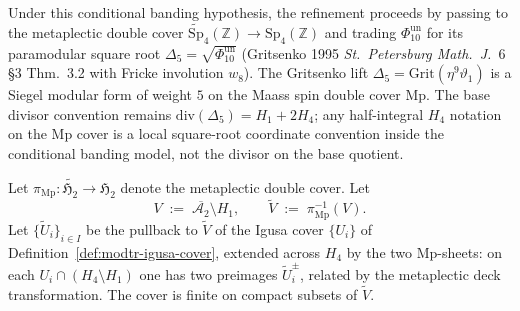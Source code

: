 Under this conditional banding hypothesis, the refinement proceeds by passing to the metaplectic double cover
$\widetilde{\mathrm{Sp}}_4(\mathbb Z)\to\mathrm{Sp}_4(\mathbb Z)$ and
trading $\Phi_{10}^{\mathrm{un}}$ for its paramodular square root
$\Delta_5 = \sqrt{\Phi_{10}^{\mathrm{un}}}$ (Gritsenko 1995 \emph{St.~Petersburg
Math.~J.}~6 \S3 Thm.~3.2 with Fricke involution $w_8$). The Gritsenko
lift $\Delta_5 = \mathrm{Grit}(\eta^9\vartheta_1)$ is a Siegel modular
form of weight $5$ on the Maass spin double cover $\mathrm{Mp}$. The
base divisor convention remains
$\mathrm{div}(\Delta_5)=H_1+2H_4$; any half-integral $H_4$ notation on
the Mp cover is a local square-root coordinate convention inside the
conditional banding model, not the divisor on the base quotient.

\begin{definition}[Metaplectic Igusa cover of \texorpdfstring{$V = \overline{\mathcal A_2}\setminus H_1$}{V = overlineA-2setminus H-1}]
\label{def:modtr-mu16-metaplectic-cover}
Let $\pi_{\mathrm{Mp}}\colon\widetilde{\mathfrak H_2}\to\mathfrak H_2$
denote the metaplectic double cover. Let
\[
 V \;:=\; \overline{\mathcal A_2}\setminus H_1,
 \qquad
 \widetilde V \;:=\; \pi_{\mathrm{Mp}}^{-1}(V).
\]
Let $\{\widetilde U_i\}_{i\in I}$ be the pullback to $\widetilde V$ of
the Igusa cover $\{U_i\}$ of
Definition~\ref{def:modtr-igusa-cover}, extended across $H_4$
by the two Mp-sheets: on each $U_i\cap(H_4\setminus H_1)$ one has two
preimages $\widetilde U_i^\pm$, related by the metaplectic deck
transformation. The cover is finite on compact subsets of $\widetilde V$.
\end{definition}

